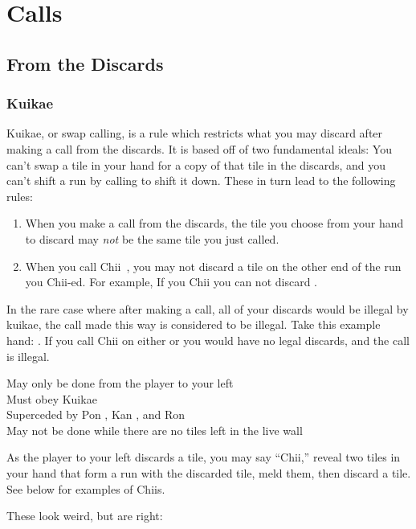 \section{Calls}\label{core:sec:calls}

\subsection{From the Discards}\label{core:ssec:discards}

\subsubsection{Kuikae}\label{core:sssec:Kuikae}

Kuikae, or swap calling, is a rule which restricts what you may discard after making a call from the discards. It is based off of two fundamental ideals: You can't swap a tile in your hand for a copy of that tile in the discards, and you can't shift a run by calling to shift it down. These in turn lead to the following rules:
\begin{enumerate}
	\item When you make a call from the discards, the tile you choose from your hand to discard may \textit{not} be the same tile you just called.
	\item When you call Chii~, you may not discard a tile on the other end of the run you Chii-ed. For example, If you Chii {} you can not discard {}.
\end{enumerate}

In the rare case where after making a call, all of your discards would be illegal by kuikae, the call made this way is considered to be illegal. Take this example hand: {}. If you call Chii on either {} or {} you would have no legal discards, and the call is illegal.

	{\symbalert May only be done from the player to your left\\
	\upgradesto Must obey Kuikae~\\
	\symbnegate Superceded by Pon , Kan , and Ron \\
	\symbnegate May not be done while there are no tiles left in the live wall}
	{As the player to your left discards a tile, you may say ``Chii,'' reveal two tiles in your hand that form a run with the discarded tile, meld them, then discard a tile. See below for examples of Chiis.
	\begin{center}These look weird, but are right: {\hspace{0.2cm}\hspace{0.2cm}}\end{center}}

